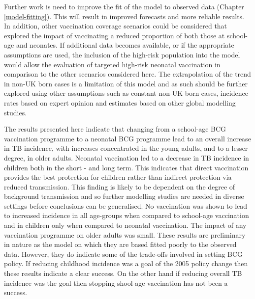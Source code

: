 \documentclass[11pt,twoside]{bristolthesis}
\begin{document}
  Further work is need to improve the fit of the model to observed data (Chapter \ref{model-fitting}). This will result in improved forecasts and more reliable results. In addition, other vaccination coverage scenarios could be considered that explored the impact of vaccinating a reduced proportion of both those at school-age and neonates. If additional data becomes available, or if the appropriate assumptions are used, the inclusion of the high-risk population into the model would allow the evaluation of targeted high-risk neonatal vaccination in comparison to the other scenarios considered here. The extrapolation of the trend in non-UK born cases is a limitation of this model and as such should be further explored using other assumptions such as constant non-UK born cases, incidence rates based on expert opinion and estimates based on other global modelling studies.
  
  The results presented here indicate that changing from a school-age BCG vaccination programme to a neonatal BCG programme lead to an overall increase in TB incidence, with increases concentrated in the young adults, and to a lesser degree, in older adults. Neonatal vaccination led to a decrease in TB incidence in children both in the short - and long term. This indicates that direct vaccination provides the best protection for children rather than indirect protection via reduced transmission. This finding is likely to be dependent on the degree of background transmission and so further modelling studies are needed in diverse settings before conclusions can be generalised. No vaccination was shown to lead to increased incidence in all age-groups when compared to school-age vaccination and in children only when compared to neonatal vaccination. The impact of any vaccination programme on older adults was small. These results are preliminary in nature as the model on which they are based fitted poorly to the observed data. However, they do indicate some of the trade-offs involved in setting BCG policy. If reducing childhood incidence was a goal of the 2005 policy change then these results indicate a clear success. On the other hand if reducing overall TB incidence was the goal then stopping shool-age vaccination has not been a success.
  
  \newpage
  
\end{document}
